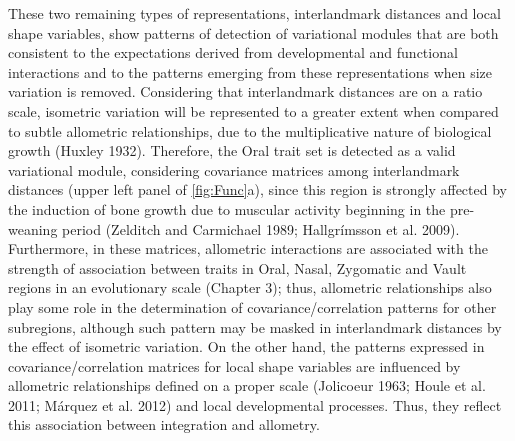 \documentclass[12pt,]{article}
\begin{document}
These two remaining types of representations, interlandmark distances
and local shape variables, show patterns of detection of variational
modules that are both consistent to the expectations derived from
developmental and functional interactions and to the patterns emerging
from these representations when size variation is removed. Considering
that interlandmark distances are on a ratio scale, isometric variation
will be represented to a greater extent when compared to subtle
allometric relationships, due to the multiplicative nature of biological
growth (Huxley 1932). Therefore, the Oral trait set is detected as a
valid variational module, considering covariance matrices among
interlandmark distances (upper left panel of \autoref{fig:Func}a), since
this region is strongly affected by the induction of bone growth due to
muscular activity beginning in the pre-weaning period (Zelditch and
Carmichael 1989; Hallgrímsson et al. 2009). Furthermore, in these
matrices, allometric interactions are associated with the strength of
association between traits in Oral, Nasal, Zygomatic and Vault regions
in an evolutionary scale (Chapter 3); thus, allometric relationships
also play some role in the determination of covariance/correlation
patterns for other subregions, although such pattern may be masked in
interlandmark distances by the effect of isometric variation. On the
other hand, the patterns expressed in covariance/correlation matrices
for local shape variables are influenced by allometric relationships
defined on a proper scale (Jolicoeur 1963; Houle et al. 2011; Márquez et
al. 2012) and local developmental processes. Thus, they reflect this
association between integration and allometry.
\end{document}

